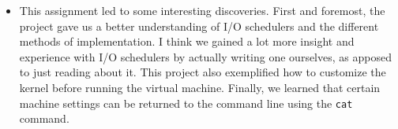 \documentclass[letterpaper,10pt,onecolumn]{IEEEtran}
\begin{document}
\begin{enumerate}
\begin{itemize}
            \item This assignment led to some interesting discoveries. First and foremost, the project gave us a better understanding of I/O schedulers and the different methods of implementation. I think we gained a lot more insight and experience with I/O schedulers by actually writing one ourselves, as apposed to just reading about it. This project also exemplified how to customize the kernel before running the virtual machine. Finally, we learned that certain machine settings can be returned to the command line using the \texttt{cat} command.
        \end{itemize}
    \end{enumerate}
    
    
\end{document}
